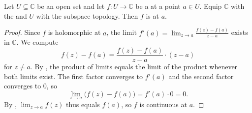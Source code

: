 \begin{proposition} \label{proposition:holomorphic_functions_on_open_subsets_of_C_are_continuous}
Let $U \subseteq \mathbb{C}$ be an open set and let $f : U \to \mathbb{C}$ be a  at a point $a \in U$. Equip $\mathbb{C}$ with the  and $U$ with the subspace topology. Then $f$ is  at $a$.
\end{proposition}

\begin{proof}
    Since $f$ is holomorphic at $a$, the limit $f'(a) = \displaystyle\lim_{z \to a} \frac{f(z) - f(a)}{z - a}$ exists in $\mathbb{C}$. We compute
    $$f(z) - f(a) = \frac{f(z) - f(a)}{z - a} \cdot (z - a)$$
    for $z \neq a$. By , the product of limits equals the limit of the product whenever both limits exist. The first factor converges to $f'(a)$ and the second factor converges to $0$, so
    $$\lim_{z \to a} \bigl(f(z) - f(a)\bigr) = f'(a) \cdot 0 = 0.$$
    By , $\displaystyle\lim_{z \to a} f(z)$ thus equals $f(a)$, so $f$ is continuous at $a$.
\end{proof}